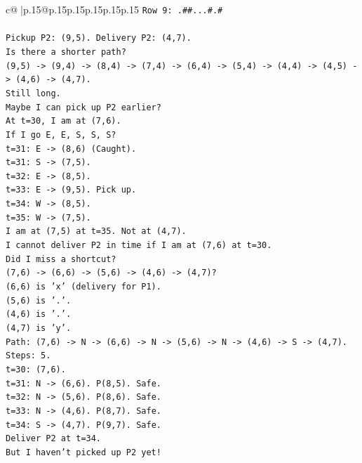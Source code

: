 \documentclass{article}
\begin{document}
{\begin{supertabular}{c@{$\;$}|p{.15\linewidth}@{}p{.15\linewidth}p{.15\linewidth}p{.15\linewidth}p{.15\linewidth}p{.15\linewidth}}
{{{\texttt{Row 9: .\#\#...\#.\#} \\
\\ 
\texttt{Pickup P2: (9,5). Delivery P2: (4,7).} \\
\texttt{Is there a shorter path?} \\
\texttt{(9,5) {-}> (9,4) {-}> (8,4) {-}> (7,4) {-}> (6,4) {-}> (5,4) {-}> (4,4) {-}> (4,5) {-}> (4,6) {-}> (4,7).} \\
\texttt{Still long.} \\
\texttt{Maybe I can pick up P2 earlier?} \\
\texttt{At t=30, I am at (7,6).} \\
\texttt{If I go E, E, S, S, S?} \\
\texttt{t=31: E {-}> (8,6) (Caught).} \\
\texttt{t=31: S {-}> (7,5).} \\
\texttt{t=32: E {-}> (8,5).} \\
\texttt{t=33: E {-}> (9,5). Pick up.} \\
\texttt{t=34: W {-}> (8,5).} \\
\texttt{t=35: W {-}> (7,5).} \\
\texttt{I am at (7,5) at t=35. Not at (4,7).} \\
\texttt{I cannot deliver P2 in time if I am at (7,6) at t=30.} \\
\texttt{Did I miss a shortcut?} \\
\texttt{(7,6) {-}> (6,6) {-}> (5,6) {-}> (4,6) {-}> (4,7)?} \\
\texttt{(6,6) is 'x' (delivery for P1).} \\
\texttt{(5,6) is '.'.} \\
\texttt{(4,6) is '.'.} \\
\texttt{(4,7) is 'y'.} \\
\texttt{Path: (7,6) {-}> N {-}> (6,6) {-}> N {-}> (5,6) {-}> N {-}> (4,6) {-}> S {-}> (4,7).} \\
\texttt{Steps: 5.} \\
\texttt{t=30: (7,6).} \\
\texttt{t=31: N {-}> (6,6). P(8,5). Safe.} \\
\texttt{t=32: N {-}> (5,6). P(8,6). Safe.} \\
\texttt{t=33: N {-}> (4,6). P(8,7). Safe.} \\
\texttt{t=34: S {-}> (4,7). P(9,7). Safe.} \\
\texttt{Deliver P2 at t=34.} \\
\texttt{But I haven't picked up P2 yet!} \\
}}}
\end{supertabular}}
\end{document}
